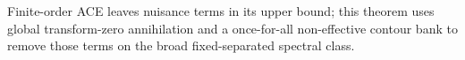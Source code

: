 Finite-order ACE leaves nuisance terms in its upper bound; this theorem uses global transform-zero annihilation and a once-for-all non-effective contour bank to remove those terms on the broad fixed-separated spectral class.